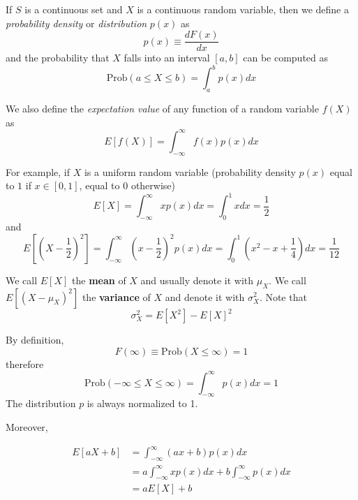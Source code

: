\documentclass[justified,sixbynine]{tufte-book}
\theoremstyle{plain}%
\theoremstyle{definition}
\theoremstyle{remark}
\begin{document}
\begin{fullwidth}
If $S$ is a continuous set and $X$ is a continuous random variable, then we
define a {\it probability density} or {\it distribution} $p(x)$ as
\begin{equation}
p(x)\equiv \frac{dF(x)}{dx}
\end{equation}
and the probability that $X$ falls into an interval $[a,b]$ can be computed
as
\begin{equation}
\textrm{Prob}(a\leq X\leq b)=\int_a^bp(x)dx
\end{equation}


We also define the {\it expectation value} of any function of a random
variable $f(X)$ as
\begin{equation}
E[f(X)]=\int_{-\infty }^\infty f(x)p(x)dx
\end{equation}

For example, if $X$ is a uniform random variable (probability density $p(x)$ equal to $1$ if
$x\in [0,1]$, equal to $0$ otherwise)
\begin{equation}
E[X]=\int_{-\infty }^\infty xp(x)dx=\int_0^1xdx=\frac 12
\end{equation}
and
\begin{equation}
E[(X-\frac 12)^2]=\int_{-\infty }^\infty (x-\frac
12)^2p(x)dx=\int_0^1(x^2-x+\frac 14)dx=\frac 1{12}
\end{equation}

We call $E[X]$ the {\bf mean} of $X$ and usually denote it with $\mu _X$.
We call $E[(X-\mu _X)^2]$ the {\bf variance} of $X$ and denote it with $%
\sigma _X^2$. Note that
\begin{equation}
\sigma _X^2=E[X^2]-E[X]^2
\end{equation}

By definition,
\begin{equation}
F(\infty )\equiv \textrm{Prob}(X\leq \infty )=1
\end{equation}
therefore
\begin{equation}
\textrm{Prob}(-\infty \leq X\leq \infty )=\int_{-\infty }^\infty p(x)dx=1
\end{equation}
The distribution $p$ is always normalized to 1.

Moreover,

\begin{align}
E[aX+b] &= \int_{-\infty }^\infty (ax+b)p(x)dx \\
&= a\int_{-\infty }^\infty xp(x)dx+b\int_{-\infty }^\infty p(x)dx \\
&= aE[X]+b
\end{align}


\end{fullwidth}
\end{document}
